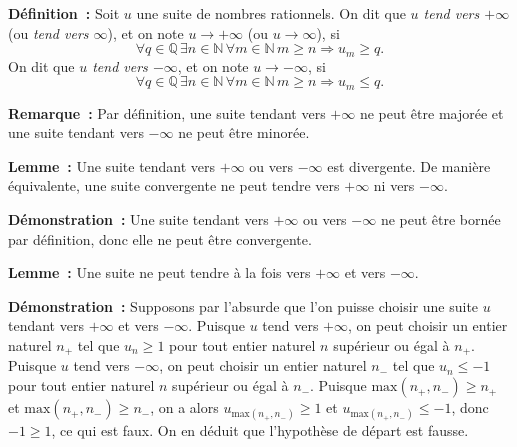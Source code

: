     \done

\medskip

\noindent\textbf{Définition :} Soit $u$ une suite de nombres rationnels. 
    On dit que \emph{$u$ tend vers $+\infty$} (ou \emph{tend vers $\infty$}), et on note $u \rightarrow + \infty$ (ou $u \rightarrow \infty$), si
    \begin{equation*}
        \forall q \in \mathbb{Q} \, 
        \exists n \in \mathbb{N} \, 
        \forall m \in \mathbb{N} \, 
        m \geq n \Rightarrow
            u_m \geq q.
    \end{equation*}
    On dit que \emph{$u$ tend vers $-\infty$}, et on note $u \rightarrow - \infty$, si
    \begin{equation*}
        \forall q \in \mathbb{Q} \, 
        \exists n \in \mathbb{N} \, 
        \forall m \in \mathbb{N} \, 
        m \geq n \Rightarrow
            u_m \leq q.
    \end{equation*}

\medskip

\noindent\textbf{Remarque :} Par définition, une suite tendant vers $+\infty$ ne peut être majorée et une suite tendant vers $-\infty$ ne peut être minorée.

\medskip

\noindent\textbf{Lemme :} Une suite tendant vers $+\infty$ ou vers $-\infty$ est divergente. 
    De manière équivalente, une suite convergente ne peut tendre vers $+\infty$ ni vers $-\infty$.

\medskip

\noindent\textbf{Démonstration :} Une suite tendant vers $+\infty$ ou vers $-\infty$ ne peut être bornée par définition, donc elle ne peut être convergente.

\done

\medskip

\noindent\textbf{Lemme :} Une suite ne peut tendre à la fois vers $+\infty$ et vers $-\infty$. 

\medskip

\noindent\textbf{Démonstration :} Supposons par l'absurde que l'on puisse choisir une suite $u$ tendant vers $+\infty$ et vers $-\infty$.
    Puisque $u$ tend vers $+\infty$, on peut choisir un entier naturel $n_+$ tel que $u_n \geq 1$ pour tout entier naturel $n$ supérieur ou égal à $n_+$.
    Puisque $u$ tend vers $-\infty$, on peut choisir un entier naturel $n_-$ tel que $u_n \leq -1$ pour tout entier naturel $n$ supérieur ou égal à $n_-$.
    Puisque $\mathrm{max}(n_+, n_-) \geq n_+$ et  $\mathrm{max}(n_+, n_-) \geq n_-$, on a alors $u_{ \mathrm{max}(n_+, n_-) } \geq 1$ et $u_{ \mathrm{max}(n_+, n_-) } \leq -1$, donc $-1 \geq 1$, ce qui est faux.
    On en déduit que l'hypothèse de départ est fausse.

